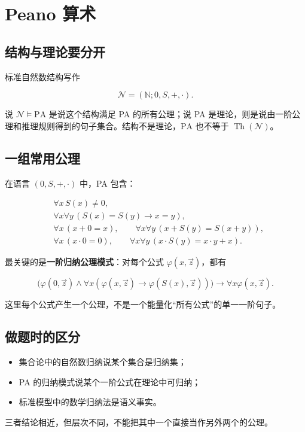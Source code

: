 \section{Peano 算术}


\subsection{结构与理论要分开}


标准自然数结构写作

\[
\mathcal N=(\mathbb N;0,S,+,\cdot).
\]

说 $\mathcal N\models\mathrm{PA}$ 是说这个结构满足 PA 的所有公理；说 PA 是理论，则是说由一阶公理和推理规则得到的句子集合。结构不是理论，$\mathrm{PA}$ 也不等于 $\operatorname{Th}(\mathcal N)$。

\subsection{一组常用公理}


在语言 $(0,S,+,\cdot)$ 中，PA 包含：

\[
\begin{aligned}
&\forall x\,S(x)\ne0,\\
&\forall x\forall y\,(S(x)=S(y)\to x=y),\\
&\forall x\,(x+0=x),\qquad
\forall x\forall y\,(x+S(y)=S(x+y)),\\
&\forall x\,(x\cdot0=0),\qquad
\forall x\forall y\,(x\cdot S(y)=x\cdot y+x).
\end{aligned}
\]

最关键的是\textbf{一阶归纳公理模式}：对每个公式 $\varphi(x,\vec z)$，都有

\[
\bigl(\varphi(0,\vec z)\land\forall x(\varphi(x,\vec z)\to\varphi(S(x),\vec z))\bigr)
\to\forall x\varphi(x,\vec z).
\]

这里每个公式产生一个公理，不是一个能量化“所有公式”的单一一阶句子。

\subsection{做题时的区分}


\begin{itemize}
\item 集合论中的自然数归纳说某个集合是归纳集；
\item PA 的归纳模式说某个一阶公式在理论中可归纳；
\item 标准模型中的数学归纳法是语义事实。
\end{itemize}


三者结论相近，但层次不同，不能把其中一个直接当作另外两个的公理。
